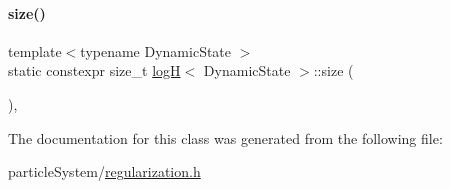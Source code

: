 \paragraph{\texorpdfstring{size()}{size()}}
{\footnotesize\ttfamily template$<$typename Dynamic\+State $>$ \\
static constexpr size\+\_\+t \mbox{\hyperlink{classlog_h}{logH}}$<$ Dynamic\+State $>$\+::size (\begin{DoxyParamCaption}{ }\end{DoxyParamCaption})\hspace{0.3cm}{\ttfamily [inline]}, {\ttfamily [static]}}



The documentation for this class was generated from the following file\+:\begin{DoxyCompactItemize}
\item 
particle\+System/\mbox{\hyperlink{regularization_8h}{regularization.\+h}}\end{DoxyCompactItemize}
